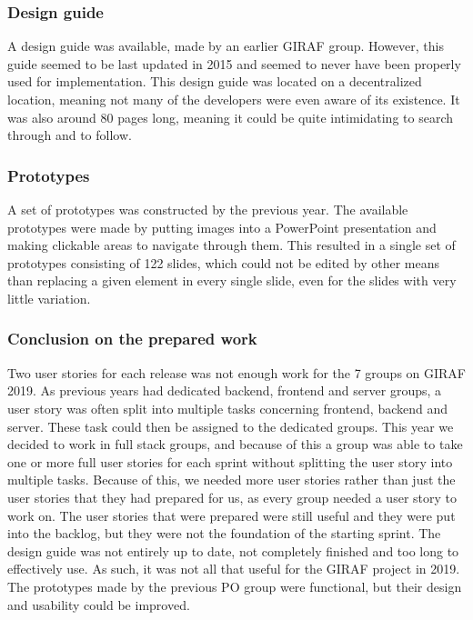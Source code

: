\subsubsection{Design guide}
A design guide was available, made by an earlier GIRAF group.
However, this guide seemed to be last updated in 2015 and seemed to never have been properly used for implementation.
This design guide was located on a decentralized location, meaning not many of the developers were even aware of its existence.
It was also around 80 pages long, meaning it could be quite intimidating to search through and to follow.

\subsubsection{Prototypes}
A set of prototypes was constructed by the previous year.
The available prototypes were made by putting images into a PowerPoint presentation and making clickable areas to navigate through them.
This resulted in a single set of prototypes consisting of 122 slides, which could not be edited by other means than replacing a given element in every single slide, even for the slides with very little variation.


\subsubsection{Conclusion on the prepared work}
Two user stories for each release was not enough work for the 7 groups on GIRAF 2019. 
As previous years had dedicated backend, frontend and server groups, a user story was often split into multiple tasks concerning frontend, backend and server.
These task could then be assigned to the dedicated groups.
This year we decided to work in full stack groups, and because of this a group was able to take one or more full user stories for each sprint without splitting the user story into multiple tasks.
Because of this, we needed more user stories rather than just the user stories that they had prepared for us, as every group needed a user story to work on.
The user stories that were prepared were still useful and they were put into the backlog, but they were not the foundation of the starting sprint.
The design guide was not entirely up to date, not completely finished and too long to effectively use.
As such, it was not all that useful for the GIRAF project in 2019.
The prototypes made by the previous PO group were functional, but their design and usability could be improved. 


